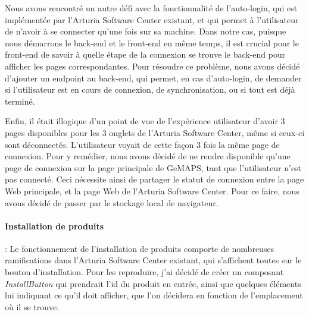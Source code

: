 \documentclass[francais]{rapportPFE}  %
\begin{document}
Nous avons rencontré un autre défi avec la fonctionnalité de l'auto-login, qui est implémentée par l'Arturia Software Center existant, et qui permet à l'utilisateur de n'avoir à se connecter qu'une fois sur sa machine. Dans notre cas, puisque nous démarrons le back-end et le front-end en même temps, il est crucial pour le front-end de savoir à quelle étape de la connexion se trouve le back-end pour afficher les pages correspondantes. Pour résoudre ce problème, nous avons décidé d'ajouter un endpoint au back-end, qui permet, en cas d'auto-login, de demander si l'utilisateur est en cours de connexion, de synchronisation, ou si tout est déjà terminé.

Enfin, il était illogique d'un point de vue de l'expérience utilisateur d'avoir 3 pages disponibles pour les 3 onglets de l'Arturia Software Center, même si ceux-ci sont déconnectés. L'utilisateur voyait de cette façon 3 fois la même page de connexion. Pour y remédier, nous avons décidé de ne rendre disponible qu'une page de connexion sur la page principale de GeMAPS, tant que l'utilisateur n'est pas connecté. Ceci nécessite ainsi de partager le statut de connexion entre la page Web principale, et la page Web de l'Arturia Software Center. Pour ce faire, nous avons décidé de passer par le stockage local de navigateur. 


\paragraph{Installation de produits}: Le fonctionnement de l'installation de produits comporte de nombreuses ramifications dans l'Arturia Software Center existant, qui s'affichent toutes sur le bouton d'installation. Pour les reproduire, j'ai décidé de créer un composant \textit{InstallButton} qui prendrait l'id du produit en entrée, ainsi que quelques éléments lui indiquant ce qu'il doit afficher, que l'on décidera en fonction de l'emplacement où il se trouve. 
\end{document}
